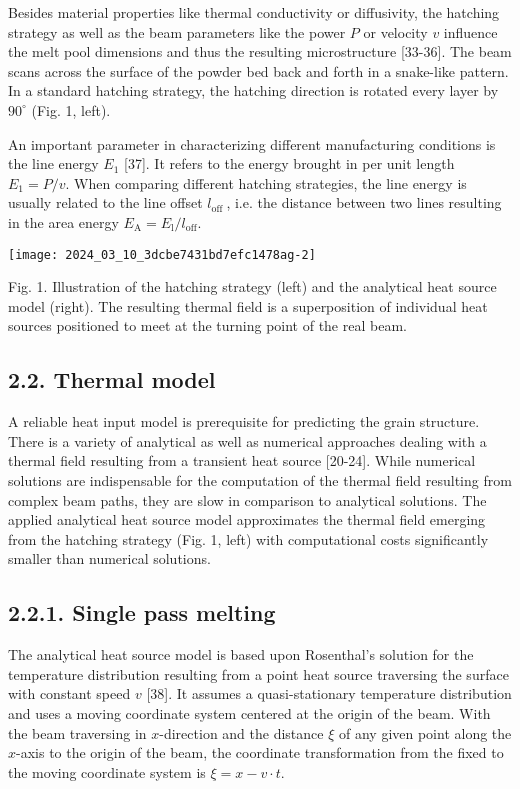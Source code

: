 \documentclass[10pt]{article}
\begin{document}
Besides material properties like thermal conductivity or diffusivity, the hatching strategy as well as the beam parameters like the power $P$ or velocity $v$ influence the melt pool dimensions and thus the resulting microstructure [33-36]. The beam scans across the surface of the powder bed back and forth in a snake-like pattern. In a standard hatching strategy, the hatching direction is rotated every layer by $90^{\circ}$ (Fig. 1, left).

An important parameter in characterizing different manufacturing conditions is the line energy $E_{1}$ [37]. It refers to the energy brought in per unit length $E_{1}=P / v$. When comparing different hatching strategies, the line energy is usually related to the line offset $l_{\text {off }}$, i.e. the distance between two lines resulting in the area energy $E_{\mathrm{A}}=E_{\mathrm{l}} / l_{\mathrm{off}}$.

\begin{center}
\texttt{[image: 2024\_03\_10\_3dcbe7431bd7efc1478ag-2]}
\end{center}

Fig. 1. Illustration of the hatching strategy (left) and the analytical heat source model (right). The resulting thermal field is a superposition of individual heat sources positioned to meet at the turning point of the real beam.

\subsection*{2.2. Thermal model}
A reliable heat input model is prerequisite for predicting the grain structure. There is a variety of analytical as well as numerical approaches dealing with a thermal field resulting from a transient heat source [20-24]. While numerical solutions are indispensable for the computation of the thermal field resulting from complex beam paths, they are slow in comparison to analytical solutions. The applied analytical heat source model approximates the thermal field emerging from the hatching strategy (Fig. 1, left) with computational costs significantly smaller than numerical solutions.

\subsection*{2.2.1. Single pass melting}
The analytical heat source model is based upon Rosenthal's solution for the temperature distribution resulting from a point heat source traversing the surface with constant speed $v$ [38]. It assumes a quasi-stationary temperature distribution and uses a moving coordinate system centered at the origin of the beam. With the beam traversing in $x$-direction and the distance $\xi$ of any given point along the $x$-axis to the origin of the beam, the coordinate transformation from the fixed to the moving coordinate system is $\xi=x-v \cdot t$.
\end{document}
